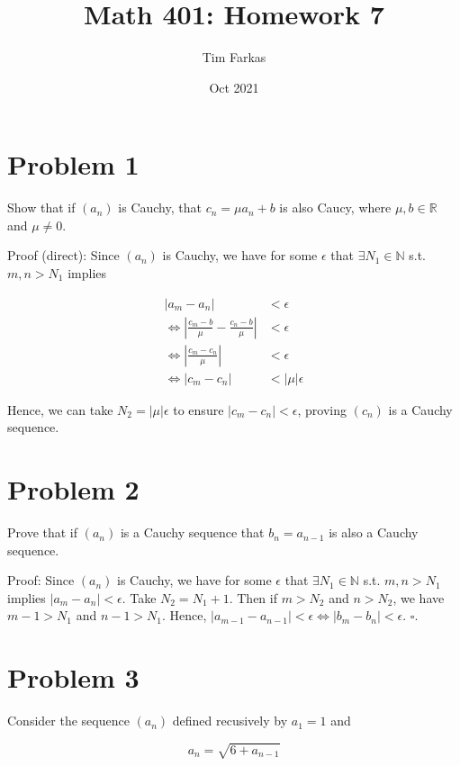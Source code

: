 \documentclass{article}
\title{Math 401: Homework 7}
\author{Tim Farkas}
\date{Oct 2021}
\begin{document}
\maketitle

\section*{Problem 1}

Show that if $(a_n)$ is Cauchy, that $c_n = \mu a_n + b$ is also Caucy, where $\mu, b \in \mathbb{R}$ and $\mu \neq 0$. 

Proof (direct): Since $(a_n)$ is Cauchy, we have for some $\epsilon$ that $\exists N_1 \in \mathbb{N}$ s.t. $m, n > N_1$ implies 

\begin{align*}
        \left|a_m - a_n\right| &< \epsilon \\
        \Leftrightarrow \left|\frac{c_m - b}{\mu} - \frac{c_n - b}{\mu}\right| &< \epsilon \\
        \Leftrightarrow \left|\frac{c_m - c_n}{\mu}\right| &< \epsilon \\
        \Leftrightarrow \left|c_m - c_n\right| &< \left|\mu\right|\epsilon
\end{align*}

Hence, we can take $N_2 = \left|\mu\right|\epsilon$ to ensure $\left|c_m - c_n\right| < \epsilon$, proving $(c_n)$ is a Cauchy sequence.  

\section*{Problem 2}

Prove that if $(a_n)$ is a Cauchy sequence that $b_n = a_{n-1}$ is also a Cauchy sequence. 

Proof: Since $(a_n)$ is Cauchy, we have for some $\epsilon$ that $\exists N_1 \in \mathbb{N}$ s.t. $m, n > N_1$ implies $\left|a_m - a_n\right| < \epsilon$. Take $N_2 = N_1 + 1$. Then if $m > N_2$ and $n > N_2$, we have $m - 1 > N_1$ and $n - 1 > N_1$. Hence, $\left|a_{m-1} - a_{n-1}\right| < \epsilon \Leftrightarrow \left|b_m - b_n\right| < \epsilon$. $\square$. 

\section*{Problem 3}

Consider the sequence $(a_n)$ defined recusively by $a_1 = 1$ and 

\begin{equation*}
        a_n = \sqrt{6 + a_{n-1}}
\end{equation*}
\end{document}
